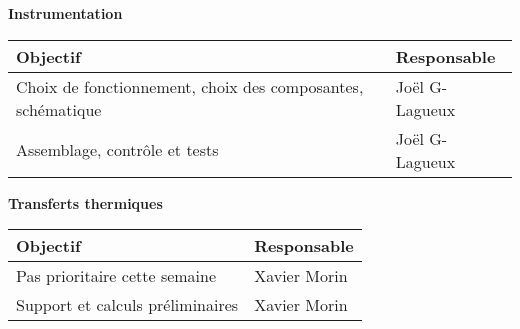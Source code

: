 \textbf{\large Instrumentation}\\
\begin{tabularx}{\linewidth}{
    |>{\hsize=1.75\hsize}X|%
    >{\hsize=0.25\hsize}X|%
  }
    \hline
    \textbf{Objectif} & \textbf{Responsable} \\\hline
    Choix de fonctionnement, choix des composantes, schématique  & Joël G-Lagueux \\\hline 
    Assemblage, contrôle et tests &  Joël G-Lagueux\\\hline
\end{tabularx}
\medskip

\textbf{\large Transferts thermiques}\\
\begin{tabularx}{\linewidth}{
    |>{\hsize=1.75\hsize}X|%
    >{\hsize=0.25\hsize}X|%
  }
    \hline
    \textbf{Objectif} & \textbf{Responsable} \\\hline
    Pas prioritaire cette semaine & Xavier Morin \\\hline
    Support et calculs préliminaires & Xavier Morin \\\hline
\end{tabularx}



%
%
%  